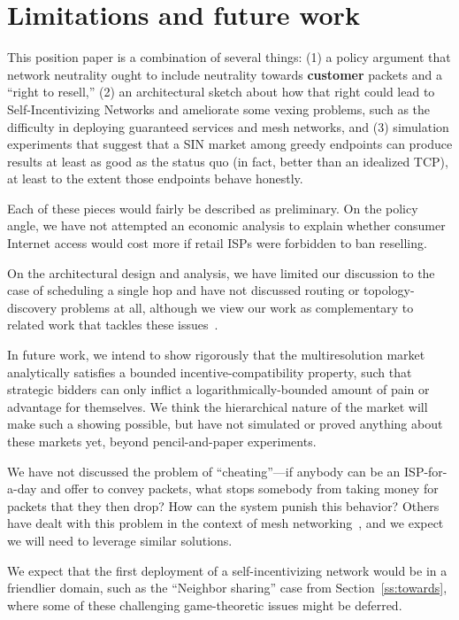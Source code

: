 \section{Limitations and future work}
\label{sec:limits}

This position paper is a combination of several things: (1) a policy
argument that network neutrality ought to include neutrality towards
\textbf{customer} packets and a ``right to resell,'' (2) an
architectural sketch about how that right could lead to 
Self-Incentivizing Networks and ameliorate some vexing problems, such
as the difficulty in deploying guaranteed services and mesh networks,
and (3) simulation experiments that suggest that a SIN market among
greedy endpoints can produce results at least as good as the status
quo (in fact, better than an idealized TCP), at least to the extent
those endpoints behave honestly.

Each of these pieces would fairly be described as preliminary. On the
policy angle, we have not attempted an economic analysis to explain
whether consumer Internet access would cost more if retail ISPs were
forbidden to ban reselling.

On the architectural design and analysis, we have limited our
discussion to the case of scheduling a single hop and have not
discussed routing or topology-discovery problems at all, although we
view our work as complementary to related work that tackles these
issues~\cite{routebazaar15, esquivel09}.

In future work, we intend to show rigorously that the multiresolution
market analytically satisfies a bounded incentive-compatibility
property, such that strategic bidders can only inflict a
logarithmically-bounded amount of pain or advantage for themselves. We
think the hierarchical nature of the market will make such a showing
possible, but have not simulated or proved anything about these
markets yet, beyond pencil-and-paper experiments.

We have not discussed the problem of ``cheating''---if anybody can be
an ISP-for-a-day and offer to convey packets, what stops somebody from
taking money for packets that they then drop? How can the system
punish this behavior? Others have dealt with this problem in the
context of mesh networking~\cite{onions14, torpath14, kadupul15}, and
we expect we will need to leverage similar solutions.

We expect that the first deployment of a self-incentivizing network
would be in a friendlier domain, such as the ``Neighbor
sharing'' case from Section~\ref{ss:towards}, where some of these
challenging game-theoretic issues might be deferred.
